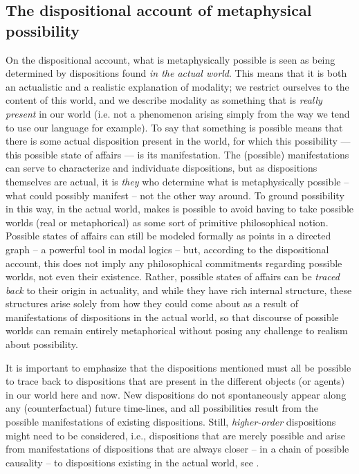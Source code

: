 \documentclass{article}
\begin{document}
\subsection*{The dispositional account of metaphysical possibility}

On the dispositional account, what is metaphysically possible is seen as being determined by dispositions found \emph{in the actual world}. This means that it is both an actualistic and a realistic explanation of modality; we restrict ourselves to the content of this world, and we describe modality as something that is \emph{really present} in our world (i.e. not a phenomenon arising simply from the way we tend to use our language for example). To say that something is possible means that there is some actual disposition present in the world, for which this possibility --- this possible state of affairs --- is its manifestation. The (possible) manifestations can serve to characterize and individuate dispositions, but as dispositions themselves are actual, it is \emph{they} who determine what is metaphysically possible -- what could possibly manifest -- not the other way around. To ground possibility in this way, in the actual world, makes is possible to avoid having to take possible worlds (real or metaphorical) as some sort of primitive philosophical notion. Possible states of affairs can still be modeled formally as points in a directed graph -- a powerful tool in modal logics -- but, according to the dispositional account, this does not imply any philosophical commitments regarding possible worlds, not even their existence. Rather, possible states of affairs can be \emph{traced back} to their origin in actuality, and while they have rich internal structure, these structures arise solely from how they could come about as a result of manifestations of dispositions in the actual world, so that discourse of possible worlds can remain entirely metaphorical without posing any challenge to realism about possibility.

It is important to emphasize that the dispositions mentioned must all be possible to trace back to dispositions that are present in the different objects (or agents) in our world here and now. New dispositions do not spontaneously appear along any (counterfactual) future time-lines, and all possibilities result from the possible manifestations of existing dispositions. Still, \emph{higher-order} dispositions might need to be considered, i.e., dispositions that are merely possible and arise from manifestations of dispositions that are always closer -- in a chain of possible causality -- to dispositions existing in the actual world, see \cite{....}.
\end{document}
